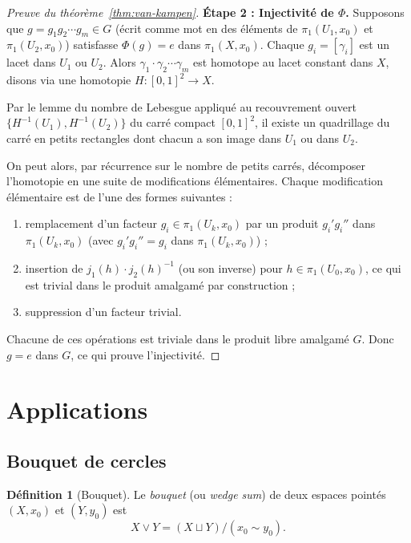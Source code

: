 \documentclass[12pt,a4paper,openany]{book}
\theoremstyle{definition}
\newtheorem{definition}{Définition}[chapter]
\theoremstyle{plain}
\theoremstyle{remark}
\begin{document}
\begin{proof}[Preuve du théorème~\ref{thm:van-kampen}]
\medskip
\textbf{Étape 2 : Injectivité de $\Phi$.}
Supposons que $g = g_1 g_2 \cdots g_m \in G$ (écrit comme mot en des éléments de
$\pi_1(U_1, x_0)$ et $\pi_1(U_2, x_0)$) satisfasse $\Phi(g) = e$ dans $\pi_1(X, x_0)$.
Chaque $g_i = [\gamma_i]$ est un lacet dans $U_1$ ou $U_2$. Alors $\gamma_1 \cdot \gamma_2
\cdots \gamma_m$ est homotope au lacet constant dans $X$, disons via une homotopie
$H \colon [0,1]^2 \to X$.

Par le lemme du nombre de Lebesgue appliqué au recouvrement ouvert
$\{H^{-1}(U_1), H^{-1}(U_2)\}$ du carré compact $[0,1]^2$, il existe un quadrillage
du carré en petits rectangles dont chacun a son image dans $U_1$ ou dans $U_2$.

On peut alors, par récurrence sur le nombre de petits carrés, décomposer l'homotopie
en une suite de modifications élémentaires. Chaque modification élémentaire est de l'une
des formes suivantes :
\begin{enumerate}[label=(\roman*)]
\item remplacement d'un facteur $g_i \in \pi_1(U_k, x_0)$ par un produit
$g_i' g_i''$ dans $\pi_1(U_k, x_0)$ (avec $g_i' g_i'' = g_i$ dans $\pi_1(U_k, x_0)$) ;
\item insertion de $j_1(h) \cdot j_2(h)^{-1}$ (ou son inverse) pour $h \in \pi_1(U_0, x_0)$,
ce qui est trivial dans le produit amalgamé par construction ;
\item suppression d'un facteur trivial.
\end{enumerate}

Chacune de ces opérations est triviale dans le produit libre amalgamé $G$.
Donc $g = e$ dans $G$, ce qui prouve l'injectivité.
\end{proof}

\section{Applications}\label{sec:applications-vk}

\subsection{Bouquet de cercles}\label{subsec:bouquet-cercles}

\begin{definition}[Bouquet]\label{def:bouquet}
Le \emph{bouquet} (ou \emph{wedge sum}) de deux espaces pointés $(X, x_0)$ et $(Y, y_0)$ est
\[
X \vee Y = (X \sqcup Y) / (x_0 \sim y_0).
\]
\end{definition}
\end{document}

